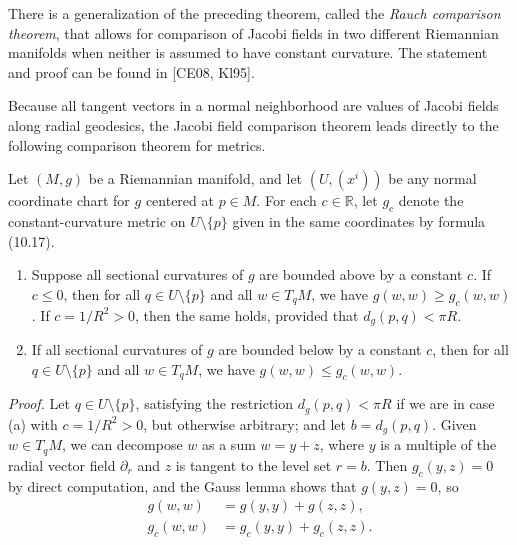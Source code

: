
There is a generalization of the preceding theorem, called the \emph{Rauch comparison theorem}, that allows for comparison of Jacobi fields in two different Riemannian manifolds when neither is assumed to have constant curvature. The statement and proof can be found in [CE08, Kl95].

Because all tangent vectors in a normal neighborhood are values of Jacobi fields along radial geodesics, the Jacobi field comparison theorem leads directly to the following comparison theorem for metrics.

\begin{theorem}
\label{thm:metric-comparison}
Let $(M, g)$ be a Riemannian manifold, and let $(U, (x^i))$ be any normal coordinate chart for $g$ centered at $p \in M$. For each $c \in \mathbb{R}$, let $g_c$ denote the constant-curvature metric on $U \setminus \{p\}$ given in the same coordinates by formula (10.17).

\begin{enumerate}
\item[(a)] Suppose all sectional curvatures of $g$ are bounded above by a constant $c$. If $c \leq 0$, then for all $q \in U \setminus \{p\}$ and all $w \in T_q M$, we have $g(w, w) \geq g_c(w, w)$. If $c = 1/R^2 > 0$, then the same holds, provided that $d_g(p, q) < \pi R$.

\item[(b)] If all sectional curvatures of $g$ are bounded below by a constant $c$, then for all $q \in U \setminus \{p\}$ and all $w \in T_q M$, we have $g(w,w) \le g_c(w,w)$.
\end{enumerate}
\end{theorem}

\emph{Proof.} Let $q \in U \setminus \{p\}$, satisfying the restriction $d_g(p, q) < \pi R$ if we are in case (a) with $c = 1/R^2 > 0$, but otherwise arbitrary; and let $b = d_g(p, q)$. Given $w \in T_q M$, we can decompose $w$ as a sum $w = y + z$, where $y$ is a multiple of the radial vector field $\partial_r$ and $z$ is tangent to the level set $r = b$. Then $g_c(y, z) = 0$ by direct computation, and the Gauss lemma shows that $g(y, z) = 0$, so
\begin{align*}
g(w, w) &= g(y, y) + g(z, z), \\
g_c(w, w) &= g_c(y, y) + g_c(z, z).
\end{align*}

